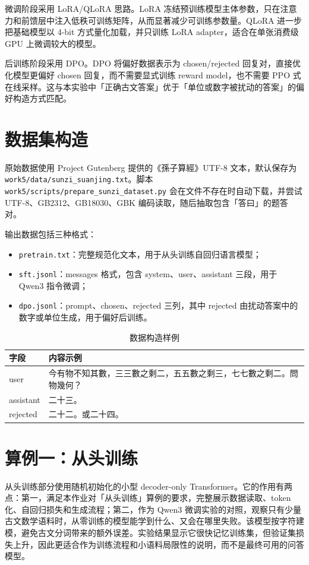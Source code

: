 \documentclass[a4paper,10pt,twocolumn]{article}
\begin{document}
微调阶段采用 LoRA/QLoRA 思路。LoRA 冻结预训练模型主体参数，只在注意力和前馈层中注入低秩可训练矩阵，从而显著减少可训练参数量。QLoRA 进一步把基础模型以 4-bit 方式量化加载，并只训练 LoRA adapter，适合在单张消费级 GPU 上微调较大的模型。

后训练阶段采用 DPO。DPO 将偏好数据表示为 chosen/rejected 回复对，直接优化模型更偏好 chosen 回复，而不需要显式训练 reward model，也不需要 PPO 式在线采样。这与本实验中「正确古文答案」优于「单位或数字被扰动的答案」的偏好构造方式匹配。

\section{数据集构造}
原始数据使用 Project Gutenberg 提供的《孫子算經》UTF-8 文本，默认保存为 \texttt{work5/data/sunzi\_suanjing.txt}。脚本 \texttt{work5/scripts/prepare\_sunzi\_dataset.py} 会在文件不存在时自动下载，并尝试 UTF-8、GB2312、GB18030、GBK 编码读取，随后抽取包含「答曰」的题答对。

输出数据包括三种格式：
\begin{itemize}
  \item \texttt{pretrain.txt}：完整规范化文本，用于从头训练自回归语言模型；
  \item \texttt{sft.jsonl}：messages 格式，包含 system、user、assistant 三段，用于 Qwen3 指令微调；
  \item \texttt{dpo.jsonl}：prompt、chosen、rejected 三列，其中 rejected 由扰动答案中的数字或单位生成，用于偏好后训练。
\end{itemize}

\begin{table}[H]
\centering
\small
\caption{数据构造样例}
\begin{tabular}{p{}|p{}}
\toprule
字段 & 内容示例 \\
\midrule
user & 今有物不知其數，三三數之剩二，五五數之剩三，七七數之剩二。問物幾何？ \\
assistant & 二十三。 \\
rejected & 二十二。或二十四。 \\
\bottomrule
\end{tabular}
\end{table}

\section{算例一：从头训练}
从头训练部分使用随机初始化的小型 decoder-only Transformer。它的作用有两点：第一，满足本作业对「从头训练」算例的要求，完整展示数据读取、token 化、自回归损失和生成流程；第二，作为 Qwen3 微调实验的对照，观察只有少量古文数学语料时，从零训练的模型能学到什么、又会在哪里失败。该模型按字符建模，避免古文分词带来的额外误差。实验结果显示它很快记忆训练集，但验证集损失上升，因此更适合作为训练流程和小语料局限性的说明，而不是最终可用的问答模型。
\end{document}
